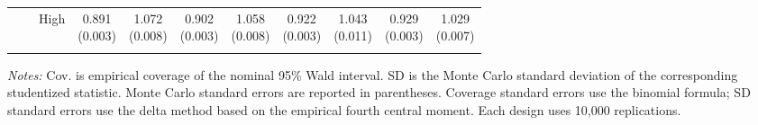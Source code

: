 \begin{table}[!t]
\begin{tabular}{lllcccccccc}
 &  & High & \shortstack{0.891\\[-1pt]\scriptsize(0.003)} & \shortstack{1.072\\[-1pt]\scriptsize(0.008)} & \shortstack{0.902\\[-1pt]\scriptsize(0.003)} & \shortstack{1.058\\[-1pt]\scriptsize(0.008)} & \shortstack{0.922\\[-1pt]\scriptsize(0.003)} & \shortstack{1.043\\[-1pt]\scriptsize(0.011)} & \shortstack{0.929\\[-1pt]\scriptsize(0.003)} & \shortstack{1.029\\[-1pt]\scriptsize(0.007)}\\
\addlinespace[1pt]
\bottomrule
\end{tabular}
\begin{minipage}{0.98\textwidth}\footnotesize\vspace{2pt}
\textit{Notes:} Cov. is empirical coverage of the nominal 95\% Wald interval. SD is the Monte Carlo standard deviation of the corresponding studentized statistic. Monte Carlo standard errors are reported in parentheses. Coverage standard errors use the binomial formula; SD standard errors use the delta method based on the empirical fourth central moment. Each design uses 10,000 replications.
\end{minipage}
\end{table}
